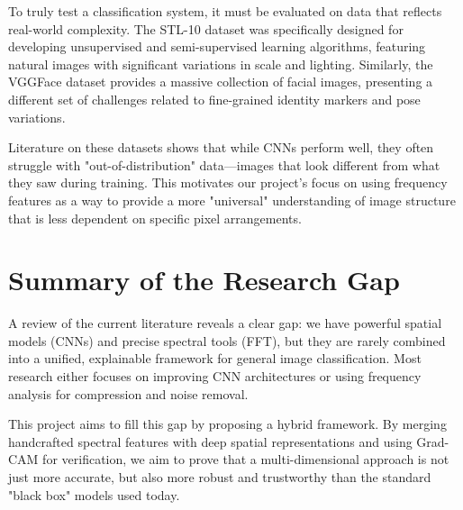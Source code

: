 To truly test a classification system, it must be evaluated on data that reflects real-world complexity. The STL-10 dataset was specifically designed for developing unsupervised and semi-supervised learning algorithms, featuring natural images with significant variations in scale and lighting. Similarly, the VGGFace dataset \cite{vggface} provides a massive collection of facial images, presenting a different set of challenges related to fine-grained identity markers and pose variations.

Literature on these datasets shows that while CNNs perform well, they often struggle with "out-of-distribution" data—images that look different from what they saw during training. This motivates our project’s focus on using frequency features as a way to provide a more "universal" understanding of image structure that is less dependent on specific pixel arrangements.

\section{Summary of the Research Gap}

A review of the current literature reveals a clear gap: we have powerful spatial models (CNNs) and precise spectral tools (FFT), but they are rarely combined into a unified, explainable framework for general image classification. Most research either focuses on improving CNN architectures or using frequency analysis for compression and noise removal.

This project aims to fill this gap by proposing a hybrid framework. By merging handcrafted spectral features with deep spatial representations and using Grad-CAM for verification, we aim to prove that a multi-dimensional approach is not just more accurate, but also more robust and trustworthy than the standard "black box" models used today.
